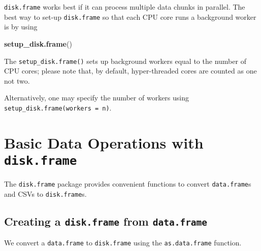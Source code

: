 \documentclass[]{book}
\newenvironment{Shaded}{\begin{snugshade}}{\end{snugshade}}
\newcommand{\KeywordTok}[1]{\textcolor[rgb]{0.13,0.29,0.53}{\textbf{#1}}}
\newcommand{\NormalTok}[1]{#1}
\begin{document}
\texttt{disk.frame} works best if it can process multiple data chunks in parallel. The best way to set-up \texttt{disk.frame} so that each CPU core runs a background worker is by using

\begin{Shaded}
\begin{Highlighting}[]
\KeywordTok{setup_disk.frame}\NormalTok{()}
\end{Highlighting}
\end{Shaded}

The \texttt{setup\_disk.frame()} sets up background workers equal to the number of CPU cores; please note that, by default, hyper-threaded cores are counted as one not two.

Alternatively, one may specify the number of workers using \texttt{setup\_disk.frame(workers\ =\ n)}.

\hypertarget{basic-data-operations-with-disk.frame}{%
\section{\texorpdfstring{Basic Data Operations with \texttt{disk.frame}}{Basic Data Operations with disk.frame}}\label{basic-data-operations-with-disk.frame}}

The \texttt{disk.frame} package provides convenient functions to convert \texttt{data.frame}s and CSVs to \texttt{disk.frame}s.

\hypertarget{creating-a-disk.frame-from-data.frame}{%
\subsection{\texorpdfstring{Creating a \texttt{disk.frame} from \texttt{data.frame}}{Creating a disk.frame from data.frame}}\label{creating-a-disk.frame-from-data.frame}}

We convert a \texttt{data.frame} to \texttt{disk.frame} using the \texttt{as.data.frame} function.
\end{document}
